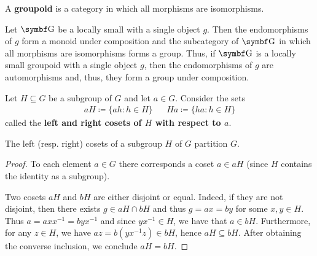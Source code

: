 \begin{definition}\label{def:magmaoid}
  A \textbf{groupoid} is a category in which all morphisms are isomorphisms.
\end{definition}

\begin{definition}\label{note:groupoids}
  Let \( \Bold G \) be a locally small with a single object \( g \). Then the endomorphisms of \( g \) form a monoid under composition and the subcategory of \( \Bold G \) in which all morphisms are isomorphisms forms a group. Thus, if \( \Bold G \) is a locally small groupoid with a single object \( g \), then the endomorphisms of \( g \) are automorphisms and, thus, they form a group under composition.
\end{definition}

\begin{definition}\label{def:group_cosets}
  Let \( H \subseteq G \) be a subgroup of \( G \) and let \( a \in G \). Consider the sets
  \begin{align*}
    aH \coloneqq \{ ah \colon h \in H \}
    &&
    Ha \coloneqq \{ ha \colon h \in H \}
  \end{align*}
  called the \textbf{left and right cosets of \( H \) with respect to \( a \)}.
\end{definition}

\begin{proposition}\label{thm:coset_partition}
  The left (resp. right) cosets of a subgroup \( H \) of \( G \) partition \( G \).
\end{proposition}
\begin{proof}
  To each element \( a \in G \) there corresponds a coset \( a \in aH \) (since \( H \) contains the identity as a subgroup).

  Two cosets \( aH \) and \( bH \) are either disjoint or equal. Indeed, if they are not disjoint, then there exists \( g \in aH \cap bH \) and thus \( g = ax = by \) for some \( x, y \in H \). Thus \( a = a x x^{-1} = b y x^{-1} \) and since \( y x^{-1} \in H \), we have that \( a \in bH \). Furthermore, for any \( z \in H \), we have \( az = b(y x^{-1} z) \in bH \), hence \( aH \subseteq bH \). After obtaining the converse inclusion, we conclude \( aH = bH \).
\end{proof}

